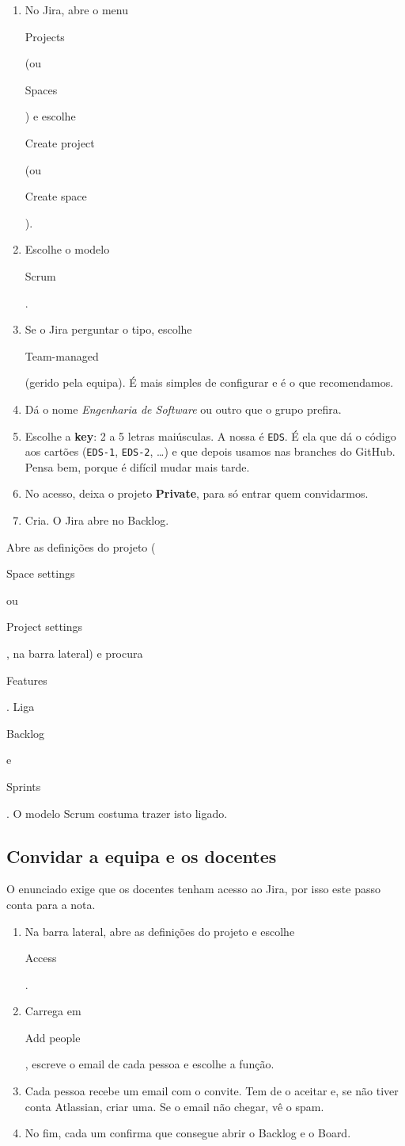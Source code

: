 \documentclass[11pt,a4paper]{article}
\newcommand{\btn}[1]{{\setlength{\fboxsep}{1.6pt}\colorbox{azulclaro}{\sffamily\small\strut #1}}}
\begin{document}
\begin{enumerate}
  \item No Jira, abre o menu \btn{Projects} (ou \btn{Spaces}) e escolhe \btn{Create project} (ou \btn{Create space}).
  \item Escolhe o modelo \btn{Scrum}.
  \item Se o Jira perguntar o tipo, escolhe \btn{Team-managed} (gerido pela equipa). É mais simples de configurar e é o que recomendamos.
  \item Dá o nome \textit{Engenharia de Software} ou outro que o grupo prefira.
  \item Escolhe a \textbf{key}: 2 a 5 letras maiúsculas. A nossa é \texttt{EDS}. É ela que dá o código aos cartões (\texttt{EDS-1}, \texttt{EDS-2}, \dots) e que depois usamos nas branches do GitHub. Pensa bem, porque é difícil mudar mais tarde.
  \item No acesso, deixa o projeto \textbf{Private}, para só entrar quem convidarmos.
  \item Cria. O Jira abre no Backlog.
\end{enumerate}

\begin{tcolorbox}[dica, title={Dica: se não vês Backlog ou Sprints}]
  Abre as definições do projeto (\btn{Space settings} ou \btn{Project settings}, na barra lateral) e procura \btn{Features}. Liga \btn{Backlog} e \btn{Sprints}. O modelo Scrum costuma trazer isto ligado.
\end{tcolorbox}

\subsection{Convidar a equipa e os docentes}

O enunciado exige que os docentes tenham acesso ao Jira, por isso este passo conta para a nota.

\begin{enumerate}
  \item Na barra lateral, abre as definições do projeto e escolhe \btn{Access}.
  \item Carrega em \btn{Add people}, escreve o email de cada pessoa e escolhe a função.
  \item Cada pessoa recebe um email com o convite. Tem de o aceitar e, se não tiver conta Atlassian, criar uma. Se o email não chegar, vê o spam.
  \item No fim, cada um confirma que consegue abrir o Backlog e o Board.
\end{enumerate}
\end{document}
